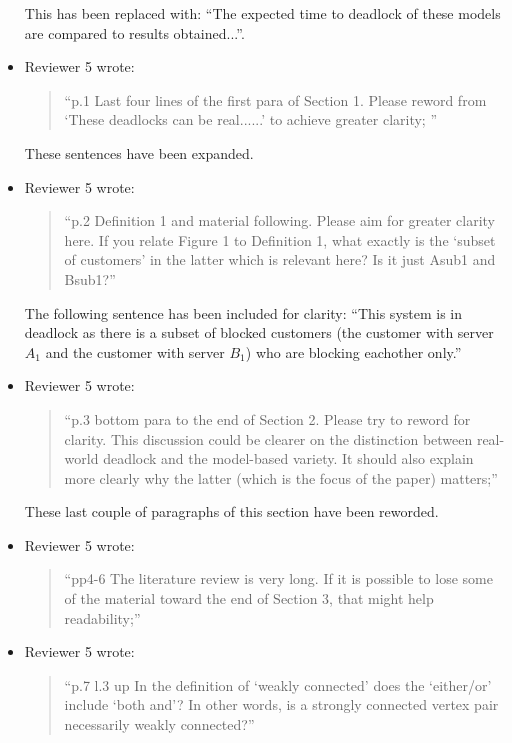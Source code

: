 \documentclass{article}
\begin{document}
\begin{itemize}
This has been replaced with: ``The expected time to deadlock of these models are compared to results obtained...''.


\item Reviewer 5 wrote:
\begin{quote}
``p.1 Last four lines of the first para of Section 1. Please reword from ‘These deadlocks can be real......’ to achieve greater clarity;
''
\end{quote}

These sentences have been expanded.


\item Reviewer 5 wrote:
\begin{quote}
``p.2 Definition 1 and material following. Please aim for greater clarity here. If you relate Figure 1 to Definition 1, what exactly is the ‘subset of customers’ in the latter which is relevant here? Is it just Asub1 and Bsub1?''
\end{quote}

The following sentence has been included for clarity: ``This system is in deadlock as there is a subset of blocked customers (the customer with server $A_1$ and the customer with server $B_1$) who are blocking eachother only.''


\item Reviewer 5 wrote:
\begin{quote}
``p.3 bottom para to the end of Section 2. Please try to reword for clarity. This discussion could be clearer on the distinction between real-world deadlock and the model-based variety. It should also explain more clearly why the latter (which is the focus of the paper) matters;''
\end{quote}

These last couple of paragraphs of this section have been reworded.


\item Reviewer 5 wrote:
\begin{quote}
``pp4-6 The literature review is very long. If it is possible to lose some of the material toward the end of Section 3, that might help readability;''
\end{quote}


\item Reviewer 5 wrote:
\begin{quote}
``p.7 l.3 up In the definition of ‘weakly connected’ does the ‘either/or’ include ‘both and’? In other words, is a strongly connected vertex pair necessarily weakly connected?''
\end{quote}



\end{itemize}
\end{document}
